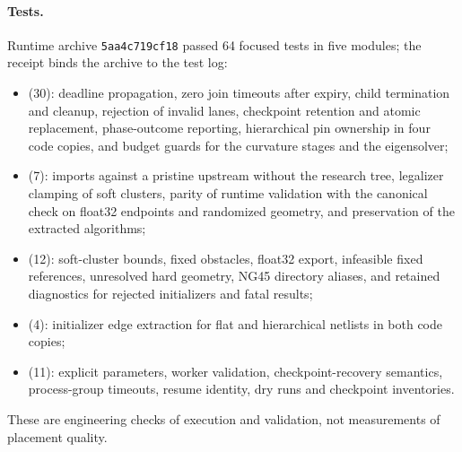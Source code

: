 \paragraph{Tests.} Runtime archive \texttt{5aa4c719cf18} passed 64 focused tests in
five modules; the receipt  binds the
archive to the test log:
\begin{itemize}
  \item {} (30): deadline propagation, zero join
        timeouts after expiry, child termination and cleanup, rejection of invalid
        lanes, checkpoint retention and atomic replacement, phase-outcome
        reporting, hierarchical pin ownership in four code copies, and budget guards
        for the curvature stages and the eigensolver;
  \item {} (7): imports against a pristine
        upstream without the research tree, legalizer clamping of soft clusters,
        parity of runtime validation with the canonical check on float32 endpoints
        and randomized geometry, and preservation of the extracted algorithms;
  \item {} (12): soft-cluster bounds, fixed obstacles,
        float32 export, infeasible fixed references, unresolved hard geometry, NG45
        directory aliases, and retained diagnostics for rejected initializers and
        fatal results;
  \item {} (4): initializer edge extraction for flat and
        hierarchical netlists in both code copies;
  \item {} (11): explicit parameters, worker
        validation, checkpoint-recovery semantics, process-group timeouts, resume
        identity, dry runs and checkpoint inventories.
\end{itemize}
These are engineering checks of execution and validation, not measurements of
placement quality.

